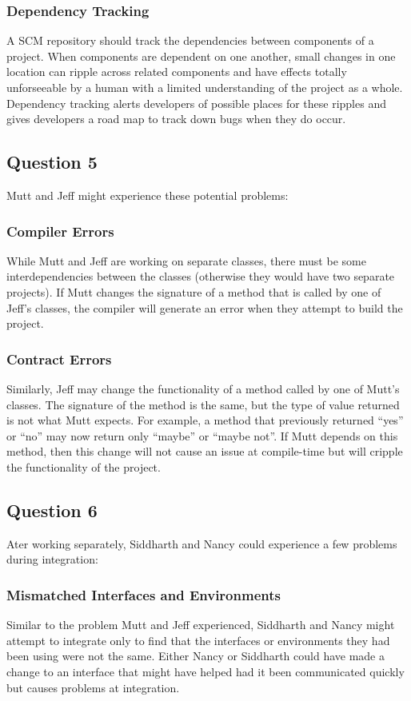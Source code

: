 \documentclass{article}
\begin{document}
\subsubsection*{Dependency Tracking}
A SCM repository should track the dependencies between components of a project.  When components are dependent on one another, small changes in one location can ripple across related components and have effects totally unforseeable by a human with a limited understanding of the project as a whole.  Dependency tracking alerts developers of possible places for these ripples and gives developers a road map to track down bugs when they do occur.

\subsection*{Question 5}
Mutt and Jeff might experience these potential problems:
\subsubsection*{Compiler Errors}
While Mutt and Jeff are working on separate classes, there must be some interdependencies between the classes (otherwise they would have two separate projects).  If Mutt changes the signature of a method that is called by one of Jeff's classes, the compiler will generate an error when they attempt to build the project.
\subsubsection*{Contract Errors}
Similarly, Jeff may change the functionality of a method called by one of Mutt's classes.  The signature of the method is the same, but the type of value returned is not what Mutt expects.  For example, a method that previously returned ``yes'' or ``no'' may now return only ``maybe'' or ``maybe not''.  If Mutt depends on this method, then this change will not cause an issue at compile-time but will cripple the functionality of the project.

\subsection*{Question 6}
Ater working separately, Siddharth and Nancy could experience a few problems during integration:
\subsubsection*{Mismatched Interfaces and Environments}
Similar to the problem Mutt and Jeff experienced, Siddharth and Nancy might attempt to integrate only to find that the interfaces or environments they had been using were not the same.  Either Nancy or Siddharth could have made a change to an interface that might have helped had it been communicated quickly but causes problems at integration.
\end{document}
